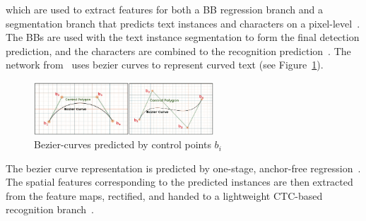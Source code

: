 which are used to extract features for both a \ac{BB} regression branch and a segmentation branch
that predicts text instances and characters on a pixel-level~\citep{lyu_mask_2018}.
The \acp{BB} are used with the text instance segmentation to form the final detection prediction, and
the characters are combined to the recognition prediction~\citep{lyu_mask_2018}.
The network from~\cite{liu_abcnet_2020} uses bezier curves to represent curved text (see
Figure~\ref{fig:bezier}).
\begin{figure}[b]
    \centering
    \includegraphics[width=0.6\textwidth]{img/E2E-2-stage-bezier-Liu-ABCNet-2020.png}
    \caption[Bezier-curves predicted by control points]{%
        Bezier-curves predicted by control points $b_i$~\citep{liu_abcnet_2020}\label{fig:bezier}
    }
\end{figure}
The bezier curve representation is predicted by one-stage, anchor-free
regression~\citep{liu_abcnet_2020}.
The spatial features corresponding to the predicted instances are then extracted from the feature
maps, rectified, and handed to a lightweight \ac{CTC}-based recognition branch~\citep{lyu_mask_2018}.
